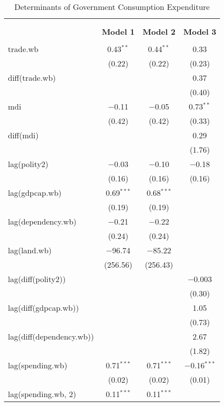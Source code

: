 
\begin{table}[!htbp] \centering 
  \caption{Determinants of Government Consumption Expenditure} 
  \label{} 
\footnotesize 
\begin{tabular}{@{\extracolsep{5pt}}lccc} 
\\[-1.8ex]\hline \\[-1.8ex] 
\\[-1.8ex] & \textbf{Model 1} & \textbf{Model 2} & \textbf{Model 3}\\ 
\hline \\[-1.8ex] 
 trade.wb & 0.43$^{**}$ & 0.44$^{**}$ & 0.33 \\ 
  & (0.22) & (0.22) & (0.23) \\ 
  diff(trade.wb) &  &  & 0.37 \\ 
  &  &  & (0.40) \\ 
  mdi & $-$0.11 & $-$0.05 & 0.73$^{**}$ \\ 
  & (0.42) & (0.42) & (0.33) \\ 
  diff(mdi) &  &  & 0.29 \\ 
  &  &  & (1.76) \\ 
  lag(polity2) & $-$0.03 & $-$0.10 & $-$0.18 \\ 
  & (0.16) & (0.16) & (0.16) \\ 
  lag(gdpcap.wb) & 0.69$^{***}$ & 0.68$^{***}$ &  \\ 
  & (0.19) & (0.19) &  \\ 
  lag(dependency.wb) & $-$0.21 & $-$0.22 &  \\ 
  & (0.24) & (0.24) &  \\ 
  lag(land.wb) & $-$96.74 & $-$85.22 &  \\ 
  & (256.56) & (256.43) &  \\ 
  lag(diff(polity2)) &  &  & $-$0.003 \\ 
  &  &  & (0.30) \\ 
  lag(diff(gdpcap.wb)) &  &  & 1.05 \\ 
  &  &  & (0.73) \\ 
  lag(diff(dependency.wb)) &  &  & 2.67 \\ 
  &  &  & (1.82) \\ 
  lag(spending.wb) & 0.71$^{***}$ & 0.71$^{***}$ & $-$0.16$^{***}$ \\ 
  & (0.02) & (0.02) & (0.01) \\ 
  lag(spending.wb, 2) & 0.11$^{***}$ & 0.11$^{***}$ &  \\ 

\end{tabular}
\end{table}

